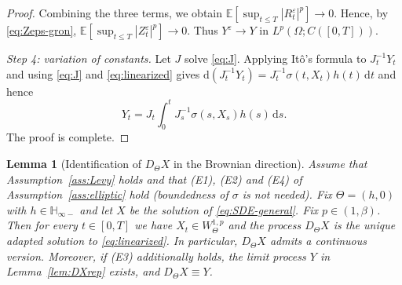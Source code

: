 \documentclass[11pt]{article}
\newcommand{\E}{\mathbb{E}}
\newcommand{\Hb}{\mathbb{H}}
\newcommand{\1}{\mathbf{1}}
\newcommand{\dd}{\mathrm{d}}
\theoremstyle{plain}
\newtheorem{lemma}[theorem]{Lemma}
\theoremstyle{definition}
\theoremstyle{remark}
\begin{document}
\begin{proof}
Combining the three terms, we obtain $\E[\sup_{t\le T}|R_t^\varepsilon|^p]\to0$.
Hence, by \eqref{eq:Zeps-gron}, $\E[\sup_{t\le T}|Z_t^\varepsilon|^p]\to0$.
Thus $Y^\varepsilon\to Y$ in $L^p(\Omega;C([0,T]))$.

\medskip
\noindent\emph{Step 4: variation of constants.}
Let $J$ solve \eqref{eq:J}. Applying It\^o's formula to $J_t^{-1}Y_t$ and using \eqref{eq:J} and \eqref{eq:linearized} gives
$\dd(J_t^{-1}Y_t)=J_t^{-1}\sigma(t,X_t)h(t)\,\dd t$ and hence
\[
Y_t=J_t\int_0^t J_s^{-1}\sigma(s,X_s)h(s)\,\dd s.
\]
The proof is complete.
\end{proof}


\begin{lemma}[Identification of $D_\Theta X$ in the Brownian direction]\label{lem:DX-identification}
Assume that Assumption~\ref{ass:Levy} holds and that (E1), (E2) and (E4) of Assumption~\ref{ass:elliptic} hold (boundedness of $\sigma$ is not needed).
Fix $\Theta=(h,0)$ with $h\in \Hb_{\infty-}$ and let $X$ be the solution of \eqref{eq:SDE-general}.
Fix $p\in(1,\beta)$. Then for every $t\in[0,T]$ we have $X_t\in W^{1,p}_\Theta$ and the process $D_\Theta X$ is the unique adapted solution to \eqref{eq:linearized}.
In particular, $D_\Theta X$ admits a continuous version.
Moreover, if \textup{(E3)} additionally holds, the limit process $Y$ in Lemma~\ref{lem:DXrep} exists, and $D_\Theta X\equiv Y$.
\end{lemma}
\end{document}

